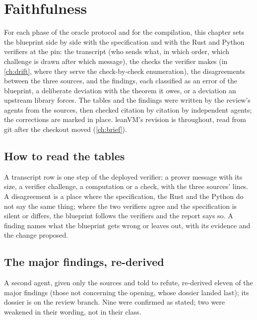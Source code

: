 \chapter{Faithfulness}\label{ch:faithfulness}

For each phase of the oracle protocol and for the compilation, this chapter sets the blueprint
side by side with the specification and with the Rust and Python verifiers at the pin: the
transcript (who sends what, in which order, which challenge is drawn after which message),
the checks the verifier makes (in \cref{ch:drift}, where they serve the check-by-check
enumeration), the disagreements between the three sources, and the findings, each classified
as an error of the blueprint, a deliberate deviation with the theorem it owes, or a deviation
an upstream library forces. The tables and the findings were written by the review's agents
from the sources, then checked citation by citation by independent agents; the corrections
are marked in place. leanVM's revision is  throughout, read from git after the
checkout moved (\cref{ch:brief}).

\section{How to read the tables}

A transcript row is one step of the deployed verifier: a prover message with its size, a
verifier challenge, a computation or a check, with the three sources' lines. A disagreement is
a place where the specification, the Rust and the Python do not say the same thing; where the
two verifiers agree and the specification is silent or differs, the blueprint follows the
verifiers and the report says so. A finding names what the blueprint gets wrong or leaves out,
with its evidence and the change proposed.

\section{The major findings, re-derived}\label{sec:faith-rederived}

A second agent, given only the sources and told to refute, re-derived eleven of the major
findings (those not concerning the opening, whose dossier landed last); its dossier is
 on the review branch. Nine were confirmed as stated; two were
weakened in their wording, not in their class.

